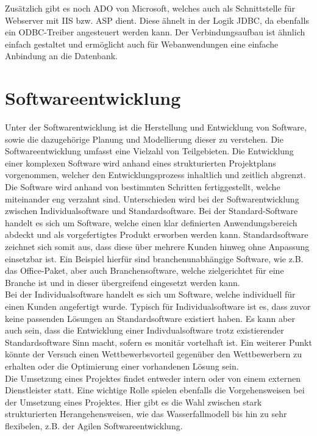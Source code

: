 Zusätzlich gibt es noch ADO von Microsoft, welches auch als Schnittstelle für Webserver mit IIS bzw. ASP dient.
Diese ähnelt in der Logik JDBC, da ebenfalls ein ODBC-Treiber angesteuert werden kann.
Der Verbindungsaufbau ist ähnlich einfach gestaltet und ermöglicht auch für Webanwendungen eine einfache Anbindung an die Datenbank.

\section{Softwareentwicklung}
\label{sec:softdev}

Unter der Softwarentwicklung ist die Herstellung und Entwicklung von Software, sowie die dazugehörige Planung und Modellierung dieser zu verstehen. Die Softwareentwicklung umfasst eine Vielzahl von Teilgebieten. Die Entwicklung einer komplexen Software wird anhand eines strukturierten Projektplans vorgenommen, welcher den Entwicklungsprozess inhaltlich und zeitlich abgrenzt. Die Software wird anhand von bestimmten Schritten fertiggestellt, welche miteinander eng verzahnt sind. Unterschieden wird bei der Softwarentwicklung zwischen Individualsoftware und Standardsoftware. Bei der Standard-Software handelt es sich um Software, welche einen klar definierten Anwendungsbereich abdeckt und als vorgefertigtes Produkt erworben werden kann. Standardsoftware zeichnet sich somit aus, dass diese über mehrere Kunden hinweg ohne Anpassung einsetzbar ist. Ein Beispiel hierfür sind branchenunabhängige Software, wie z.B. das Office-Paket, aber auch Branchensoftware, welche zielgerichtet für eine Branche ist und in dieser übergreifend eingesetzt werden kann.\\
Bei der Individualsoftware handelt es sich um Software, welche individuell für einen Kunden angefertigt wurde. Typisch für Individualsoftware ist es, dass zuvor keine passenden Lösungen an Standardsoftware existiert haben.  Es kann aber auch sein, dass die Entwicklung einer Indivdualsoftware trotz existierender Standardsoftware Sinn macht, sofern es monitär vortelhaft ist.
Ein weiterer Punkt  könnte der Versuch einen Wettbewerbsvorteil gegenüber den Wettbewerbern zu erhalten oder die Optimierung einer vorhandenen Lösung sein.\\
Die Umsetzung eines Projektes findet entweder intern oder von einem externen Dienstleister statt. Eine wichtige Rolle spielen ebenfalls die Vorgehensweisen bei der Umsetzung eines Projektes. Hier gibt es die Wahl zwischen stark strukturierten Herangehensweisen, wie das Wasserfallmodell bis hin zu sehr flexibelen, z.B. der Agilen Softwareentwicklung.\\
